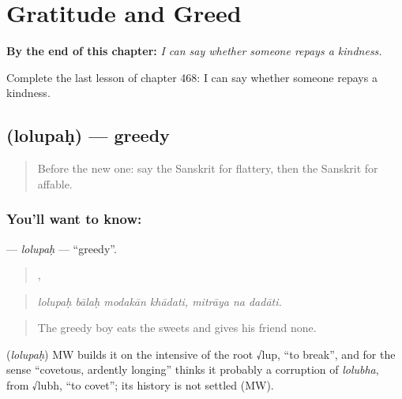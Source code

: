 
\chapter{Gratitude and Greed}
\label{ch:sa-gratitude-and-greed}

\begin{chapteropening}
\textbf{By the end of this chapter:} \emph{I can say whether someone repays a kindness.}

Complete the last lesson of chapter 468: I can say whether someone repays a kindness.
\end{chapteropening}

\section[\texorpdfstring{\sk{लोलुपः} (lolupaḥ)}{लोलुपः (lolupaḥ)}]{ (lolupaḥ) — greedy}

\label{lesson:SA-C468-lolupah}



\begin{quote}
Before the new one: say the Sanskrit for flattery, then the Sanskrit for affable.
\end{quote}

\subsection*{You'll want to know: }
\textbf{} — \emph{lolupaḥ} — \textquotedblleft{}greedy\textquotedblright{}.

\begin{quote}
   ,   
\end{quote}

\begin{quote}
\emph{lolupaḥ bālaḥ modakān khādati, mitrāya na dadāti.}
\end{quote}

\begin{quote}
The greedy boy eats the sweets and gives his friend none.
\end{quote}

\begin{cousinweb}
\textbf{} (\emph{lolupaḥ}) MW builds it on the intensive of the root √lup, \textquotedblleft{}to break\textquotedblright{}, and for the sense \textquotedblleft{}covetous, ardently longing\textquotedblright{} thinks it probably a corruption of \emph{lolubha}, from √lubh, \textquotedblleft{}to covet\textquotedblright{}; its history is not settled (MW).
\end{cousinweb}

